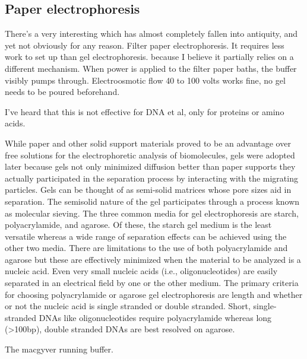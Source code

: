 \documentclass[paper.tex]{subfiles}
\begin{document}
\subsection{Paper electrophoresis}

There's a very interesting which has almost completely fallen into antiquity, and yet not obviously for any reason. Filter paper electrophoresis. It requires less work to set up than gel electrophoresis. because I believe it partially relies on a different mechanism. When power is applied to the filter paper baths, the buffer visibly pumps through. \cite{ELECTROPHORESIS1951} Electroosmotic flow 40 to 100 volts works fine, no gel needs to be poured beforehand.

I've heard that this is not effective for DNA et al, only for proteins or amino acids.


\cite{gelelectrophoresis}
\begin{fquote}
	While paper and other solid support materials proved to be an advantage over free solutions for the electrophoretic analysis of biomolecules, gels were adopted later because gels not only minimized diffusion better than paper supports they actually participated in the separation process by interacting with the migrating particles. Gels can be thought of as semi-solid matrices whose pore sizes aid in separation. The semisolid nature of the gel participates through a process known as molecular sieving. The three common media for gel electrophoresis are starch, polyacrylamide, and agarose. Of these, the starch gel medium is the least versatile whereas a wide range of separation effects can be achieved using the other two media. There are limitations to the use of both polyacrylamide and agarose but these are effectively minimized when the material to be analyzed is a nucleic acid. Even very small nucleic acids (i.e., oligonucleotides) are easily separated in an electrical field by one or the other medium. The primary criteria for choosing polyacrylamide or agarose gel electrophoresis are length and whether or not the nucleic acid is single stranded or double stranded. Short, single-stranded DNAs like oligonucleotides require polyacrylamide whereas long (>100bp), double stranded DNAs are best resolved on agarose.
\end{fquote}

The macgyver running buffer\cite{MACGYVER2005}.

\cite{Inexpensive1955}
\end{document}
